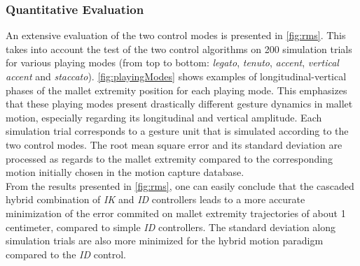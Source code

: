 			\subsubsection{Quantitative Evaluation}
			\label{subsubsec:Synthesis_Physics_Results_QuantitativeEval}



An extensive evaluation of the two control modes is presented in \myfigname \ref{fig:rms}. This takes into account the test of the two control algorithms on 200 simulation trials for various playing modes (from top to bottom: \emph{legato}, \emph{tenuto}, \emph{accent}, \emph{vertical accent} and \emph{staccato}). \myfigname \ref{fig:playingModes} shows examples of longitudinal-vertical phases of the mallet extremity position for each playing mode. This emphasizes that these playing modes present drastically different gesture dynamics in mallet motion, especially regarding its longitudinal and vertical amplitude. Each simulation trial corresponds to a gesture unit that is simulated according to the two control modes. The root mean square error and its standard deviation are processed as regards to the mallet extremity compared to the corresponding motion initially chosen in the motion capture database.\\

From the results presented in \myfigname \ref{fig:rms}, one can easily conclude that the cascaded hybrid combination of \emph{IK} and \emph{ID} controllers leads to a more accurate minimization of the error commited on mallet extremity trajectories of about 1 centimeter, compared to simple \emph{ID} controllers. The standard deviation along simulation trials are also more minimized for the hybrid motion paradigm compared to the \emph{ID} control.\\ %

